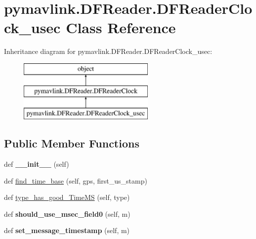 \hypertarget{classpymavlink_1_1DFReader_1_1DFReaderClock__usec}{}\section{pymavlink.\+D\+F\+Reader.\+D\+F\+Reader\+Clock\+\_\+usec Class Reference}
\label{classpymavlink_1_1DFReader_1_1DFReaderClock__usec}
Inheritance diagram for pymavlink.\+D\+F\+Reader.\+D\+F\+Reader\+Clock\+\_\+usec\+:\begin{figure}[H]
\begin{center}
\leavevmode
\includegraphics[height=3.000000cm]{classpymavlink_1_1DFReader_1_1DFReaderClock__usec}
\end{center}
\end{figure}
\subsection*{Public Member Functions}
\begin{DoxyCompactItemize}
\item 
\mbox{\label{classpymavlink_1_1DFReader_1_1DFReaderClock__usec_a392d07c4a8ea07255cd30ecb41322e7c}} 
def {\bfseries \+\_\+\+\_\+init\+\_\+\+\_\+} (self)
\item 
def \hyperlink{classpymavlink_1_1DFReader_1_1DFReaderClock__usec_a51f152f71a97dba73aab7ac85b834e0c}{find\+\_\+time\+\_\+base} (self, gps, first\+\_\+us\+\_\+stamp)
\item 
def \hyperlink{classpymavlink_1_1DFReader_1_1DFReaderClock__usec_a658ce3984924e888cdad51074ef580e1}{type\+\_\+has\+\_\+good\+\_\+\+Time\+MS} (self, type)
\item 
\mbox{\label{classpymavlink_1_1DFReader_1_1DFReaderClock__usec_aab8e5669f4942ae8623fc54fd28ce6af}} 
def {\bfseries should\+\_\+use\+\_\+msec\+\_\+field0} (self, m)
\item 
\mbox{\label{classpymavlink_1_1DFReader_1_1DFReaderClock__usec_a27bbe7d8bf34d89c9eff353dc71252f0}} 
def {\bfseries set\+\_\+message\+\_\+timestamp} (self, m)
\end{DoxyCompactItemize}
